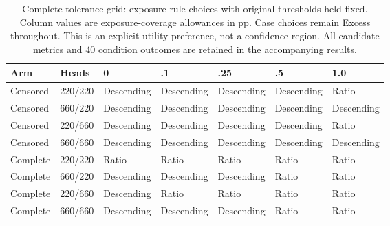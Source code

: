 \begin{table}[t]\centering\scriptsize
\caption{Complete tolerance grid: exposure-rule choices with original thresholds held fixed. Column values are exposure-coverage allowances in pp. Case choices remain Excess throughout. This is an explicit utility preference, not a confidence region. All candidate metrics and 40 condition outcomes are retained in the accompanying results.}\label{tab:v8-tolerance-grid}
\begin{tabular}{lllllll}\toprule
Arm & Heads & 0 & .1 & .25 & .5 & 1.0\\\midrule
Censored & 220/220 & Descending & Descending & Descending & Descending & Ratio \\
Censored & 660/220 & Descending & Descending & Descending & Descending & Descending \\
Censored & 220/660 & Descending & Descending & Descending & Descending & Ratio \\
Censored & 660/660 & Descending & Descending & Descending & Descending & Descending \\
Complete & 220/220 & Ratio & Ratio & Ratio & Ratio & Ratio \\
Complete & 660/220 & Descending & Descending & Descending & Ratio & Ratio \\
Complete & 220/660 & Descending & Ratio & Ratio & Ratio & Ratio \\
Complete & 660/660 & Descending & Descending & Descending & Ratio & Ratio \\
\bottomrule\end{tabular}\end{table}
